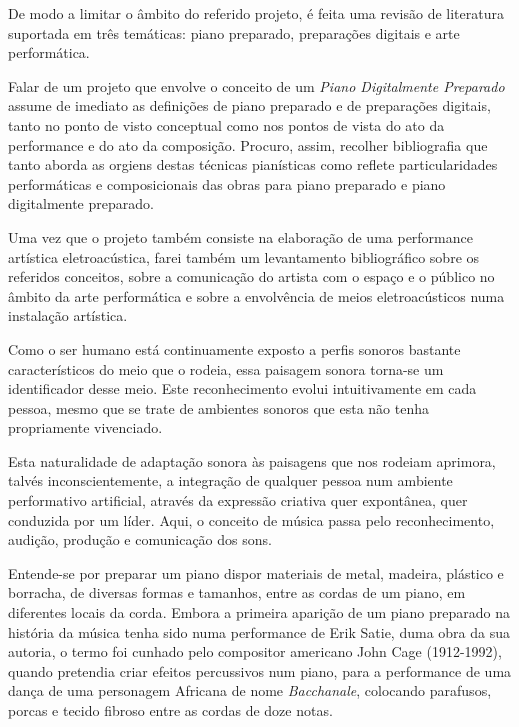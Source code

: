 \documentclass[../main.tex]{subfiles}
\begin{document}
De modo a limitar o âmbito do referido projeto, é feita uma revisão de literatura suportada em três temáticas: piano preparado, preparações digitais e arte performática.

Falar de um projeto que envolve o conceito de um \textit{Piano Digitalmente Preparado} assume de imediato as definições de piano preparado e de preparações digitais, tanto no ponto de visto conceptual como nos pontos de vista do ato da performance e do ato da composição. Procuro, assim, recolher bibliografia que tanto aborda as orgiens destas técnicas pianísticas como reflete particularidades performáticas e composicionais das obras para piano preparado e piano digitalmente preparado.

Uma vez que o projeto também consiste na elaboração de uma performance artística eletroacústica, farei também um levantamento bibliográfico sobre os referidos conceitos, sobre a comunicação do artista com o espaço e o público no âmbito da arte performática e sobre a envolvência de meios eletroacústicos numa instalação artística.

Como o ser humano está continuamente exposto a perfis sonoros bastante característicos do meio que o rodeia, essa paisagem sonora torna-se um identificador desse meio\cite{schafer1993}. Este reconhecimento evolui intuitivamente em cada pessoa, mesmo que se trate de ambientes sonoros que esta não tenha propriamente vivenciado.

Esta naturalidade de adaptação sonora às paisagens que nos rodeiam aprimora, talvés inconscientemente, a integração de qualquer pessoa num ambiente performativo artificial, através da expressão criativa quer expontânea, quer conduzida por um líder. Aqui, o conceito de música passa pelo reconhecimento, audição, produção e comunicação dos sons\cite{paynter1992}.

Entende-se por preparar um piano dispor materiais de metal, madeira, plástico e borracha, de diversas formas e tamanhos, entre as cordas de um piano, em diferentes locais da corda\cite{anderson2012}. Embora a primeira aparição de um piano preparado na história da música tenha sido numa performance de Erik Satie, duma obra da sua autoria\cite{dianova2008}, o termo foi cunhado pelo compositor americano John Cage (1912-1992), quando pretendia criar efeitos percussivos num piano, para a performance de uma dança de uma personagem Africana de nome \textit{Bacchanale}, colocando parafusos, porcas e tecido fibroso entre as cordas de doze notas\cite{cage1981, pritchett1993, bunger1981}.
\end{document}
